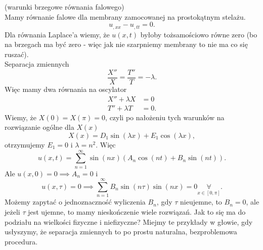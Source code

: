 \documentclass[../main.tex]{subfiles}
\begin{document}
				\begin{przyklad}
						(warunki brzegowe równania falowego)\\
						Mamy równanie falowe dla membrany zamocowanej na prostokątnym stelażu.
						\[
						u_{,x x} - u_{,t t} = 0
						.\]
						Dla równania Laplace'a wiemy, że $u(x,t)$ byłoby tożsamościowo równe zero (bo na brzegach ma być zero - więc jak nie szarpniemy membrany to nie ma co się ruszać).\\
						Separacja zmiennych
						\[
								\frac{X''}{X} = \frac{T''}{T} = -\lambda
						.\]
						Więc mamy dwa równania na oscylator
						\begin{align*}
								X'' + \lambda X &= 0\\
								T'' + \lambda T &= 0
						.\end{align*}
						Wiemy, że $X(0) = X(\pi) = 0$, czyli po nałożeniu tych warunków na rozwiązanie ogólne dla $X(x)$
						\[
								X(x) = D_1 \sin(\lambda x) + E_1 \cos(\lambda x)
						,\]
						otrzymujemy $E_1 = 0$ i $\lambda = n^2$. Więc
						\[
								u(x,t) = \sum_{n=1}^{\infty} \sin(nx)\left( A_n \cos(nt) + B_n \sin(nt) \right)
						.\]
						Ale $u(x,0) = 0 \implies A_n = 0$ i
						\[
								u(x,\tau) = 0 \implies \sum_{n=1}^{\infty} B_n \sin(n\tau) \sin(nx) = 0 \underset{x\in [0,\pi]}{\forall}
						.\]
						Możemy zapytać o jednoznaczność wyliczenia $B_n$, gdy $\tau$ nieujemne, to $B_n = 0$, ale jeżeli  $\tau$ jest ujemne, to mamy nieskończenie wiele rozwiązań. Jak to się ma do podziału na wielkości fizyczne i niefizyczne? Miejmy te przykłady w głowie, gdy usłyszymy, że separacja zmiennych to po prostu naturalna, bezproblemowa procedura.


				\end{przyklad}
\end{document}
